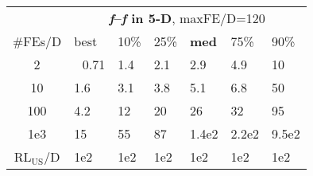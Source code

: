 \begin{tabular}{c|llllll}
 & \multicolumn{6}{|c}{\textbf{\textit{f}\raisebox{-0.35ex}{1}--\textit{f}\raisebox{-0.35ex}{24} in 5-D}, maxFE/D=120}\\
\#FEs/D & best & 10\% & 25\% & \textbf{med} & 75\% & 90\%\\
2 & ~\,0.71 & \hspace*{1ex}1.4 & \hspace*{1ex}2.1 & \hspace*{1ex}2.9 & \hspace*{1ex}4.9 & 10\\
10 & \hspace*{1ex}1.6 & \hspace*{1ex}3.1 & \hspace*{1ex}3.8 & \hspace*{1ex}5.1 & \hspace*{1ex}6.8 & 50\\
100 & \hspace*{1ex}4.2 & 12 & 20 & 26 & 32 & 95\\
1e3 & 15 & 55 & 87 & 1.4e2 & 2.2e2 & 9.5e2\\
$\text{RL}_{\text{US}}$/D & 1e2 & 1e2 & 1e2 & 1e2 & 1e2 & 1e2
\end{tabular}
